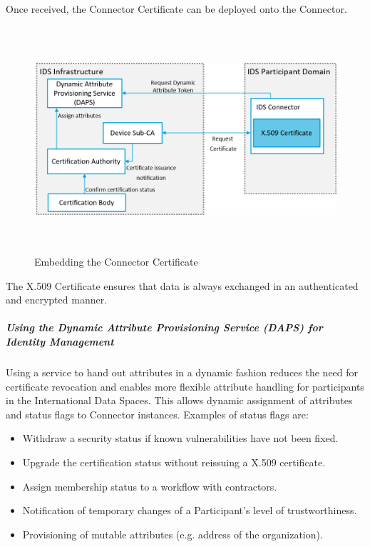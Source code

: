 Once received, the Connector Certificate can be deployed onto the Connector.




\begin{figure}[H]
	\begin{Center}
		\includegraphics[width=6.53in,height=3.29in]{./media/image59.png}
		\caption{ Embedding the Connector Certificate }
		\label{fig:_Embedding_the_Connector_Certificate_}
	\end{Center}
\end{figure}




The X.509 Certificate ensures that data is always exchanged in an authenticated and encrypted manner.

\subparagraph*{Using the Dynamic Attribute Provisioning Service (DAPS) for Identity Management \\}
Using a service to hand out attributes in a dynamic fashion reduces the need for certificate revocation and enables more flexible attribute handling for participants in the International Data Spaces. This allows dynamic assignment of attributes and status flags to Connector instances. Examples of status flags are:

\begin{itemize}
	\item Withdraw a security status if known vulnerabilities have not been fixed.

	\item Upgrade the certification status without reissuing a X.509 certificate.

	\item Assign membership status to a workflow with contractors.

	\item Notification of temporary changes of a Participant’s level of trustworthiness.

	\item Provisioning of mutable attributes (e.g. address of the organization).

\end{itemize}

